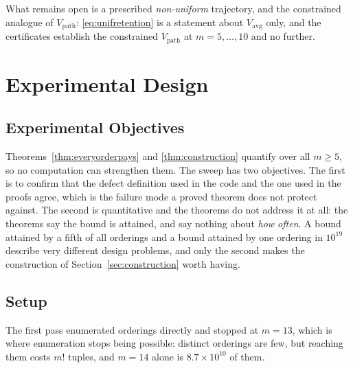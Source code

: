 
What remains open is a prescribed \emph{non-uniform} trajectory, and the constrained analogue
of $V_{\mathrm{path}}$: \eqref{eq:unifretention} is a statement about $V_{\mathrm{avg}}$ only,
and the certificates establish the constrained $V_{\mathrm{path}}$ at $m=5,\dots,10$ and no
further.

\section{Experimental Design}
\label{sec:expdesign}

\subsection{Experimental Objectives}

Theorems~\ref{thm:everyorderpays} and \ref{thm:construction} quantify over all $m\ge5$, so no
computation can strengthen them. The sweep has two objectives. The first is to confirm that
the defect definition used in the code and the one used in the proofs agree, which is the
failure mode a proved theorem does not protect against. The second is quantitative and the
theorems do not address it at all: the theorems say the bound is attained, and say nothing
about \emph{how often}. A bound attained by a fifth of all orderings and a bound attained by
one ordering in $10^{19}$ describe very different design problems, and only the second makes
the construction of Section~\ref{sec:construction} worth having.

\subsection{Setup}

The first pass enumerated orderings directly and stopped at $m=13$, which is where
enumeration stops being possible: distinct orderings are few, but reaching them costs $m!$
tuples, and $m=14$ alone is $8.7\times10^{10}$ of them.

